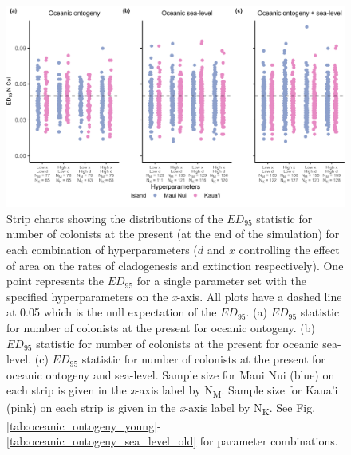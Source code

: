 \begin{figure}
    \centering
    \includegraphics[width=\textwidth]{JBI-21-0508_FigS10.png}
    \caption{Strip charts showing the distributions of the $ED_{95}$ statistic for number of colonists at the present (at the end of the simulation) for each combination of hyperparameters ($d$ and $x$ controlling the effect of area on the rates of cladogenesis and extinction respectively). One point represents the $ED_{95}$ for a single parameter set with the specified hyperparameters on the \textit{x}-axis. All plots have a dashed line at 0.05 which is the null expectation of the $ED_{95}$. (a) $ED_{95}$ statistic for number of colonists at the present for oceanic ontogeny. (b) $ED_{95}$ statistic for number of colonists at the present for oceanic sea-level. (c) $ED_{95}$ statistic for number of colonists at the present for oceanic ontogeny and sea-level. Sample size for Maui Nui (blue) on each strip is given in the \textit{x}-axis label by N\textsubscript{M}. Sample size for Kaua'i (pink) on each strip is given in the \textit{x}-axis label by N\textsubscript{K}. See Fig. \ref{tab:oceanic_ontogeny_young}-\ref{tab:oceanic_ontogeny_sea_level_old} for parameter combinations.}
    \label{fig:Hyperparameters_num_col}
\end{figure}

